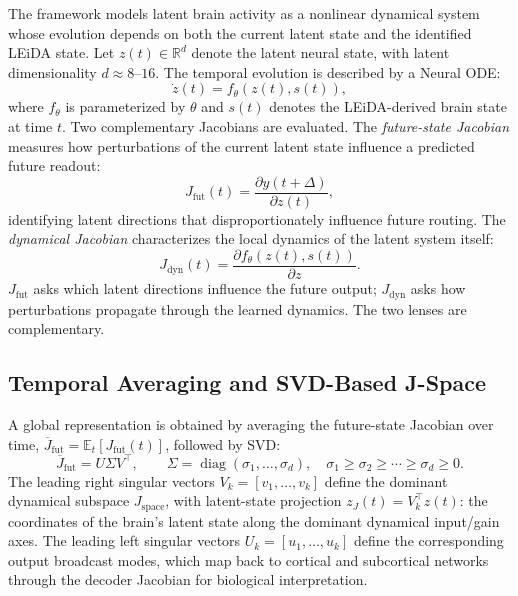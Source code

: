 \documentclass{article}
\begin{document}
The framework models latent brain activity as a nonlinear dynamical system whose evolution depends on both the current latent state and the identified LEiDA state. Let $z(t)\in\mathbb{R}^{d}$ denote the latent neural state, with latent dimensionality $d\approx 8$--$16$. The temporal evolution is described by a Neural ODE:
\begin{equation}
\dot{z}(t)=f_{\theta}(z(t),s(t)),
\end{equation}
where $f_{\theta}$ is parameterized by $\theta$ and $s(t)$ denotes the LEiDA-derived brain state at time $t$. Two complementary Jacobians are evaluated. The \textit{future-state Jacobian} measures how perturbations of the current latent state influence a predicted future readout:
\begin{equation}
J_{\mathrm{fut}}(t)=\frac{\partial y(t+\Delta)}{\partial z(t)},
\end{equation}
identifying latent directions that disproportionately influence future routing. The \textit{dynamical Jacobian} characterizes the local dynamics of the latent system itself:
\begin{equation}
J_{\mathrm{dyn}}(t)=\frac{\partial f_{\theta}(z(t),s(t))}{\partial z}.
\end{equation}
$J_{\mathrm{fut}}$ asks which latent directions influence the future output; $J_{\mathrm{dyn}}$ asks how perturbations propagate through the learned dynamics. The two lenses are complementary.

\subsection{Temporal Averaging and SVD-Based J-Space}

A global representation is obtained by averaging the future-state Jacobian over time, $\overline{J}_{\mathrm{fut}}=\mathbb{E}_t[J_{\mathrm{fut}}(t)]$, followed by SVD:
\begin{equation}
\overline{J}_{\mathrm{fut}}=U\Sigma V^{\top},\qquad
\Sigma=\operatorname{diag}(\sigma_1,\ldots,\sigma_d),\quad
\sigma_1\geq\sigma_2\geq\cdots\geq\sigma_d\geq0.
\end{equation}
The leading right singular vectors $V_k = [v_1, \ldots, v_k]$ define the dominant dynamical subspace $J_{\mathrm{space}}$, with latent-state projection $z_J(t)=V_k^{\top}z(t)$: the coordinates of the brain's latent state along the dominant dynamical input/gain axes. The leading left singular vectors $U_k = [u_1, \ldots, u_k]$ define the corresponding output broadcast modes, which map back to cortical and subcortical networks through the decoder Jacobian for biological interpretation.
\end{document}

